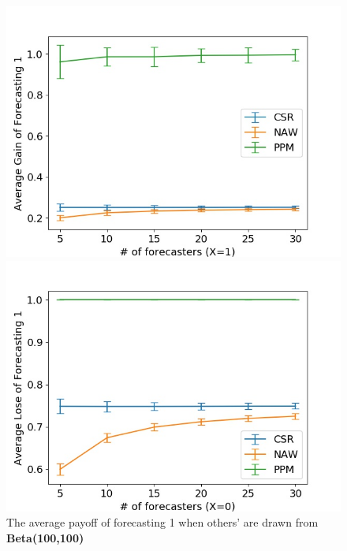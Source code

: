 \documentclass[english,10pt]{article}
\begin{document}
\begin{enumerate}
	\begin{figure}[H]
        	\centering
        	\begin{minipage}{0.48\textwidth}
        	\includegraphics[width = \textwidth]{Ind(Beta(100_100)F_UnifW)Avg_gain_of_forecasting_1.jpg}
        	\end{minipage}
        	\begin{minipage}{0.48\textwidth}
        	\includegraphics[width = \textwidth]{Ind(Beta(100_100)F_UnifW)Avg_lose_of_forecasting_1.jpg}
        	\end{minipage}
        	\caption{The average payoff of forecasting 1 when others' are drawn from \textbf{Beta(100,100)}}
        	\end{figure}
	\end{enumerate}
\end{document}
